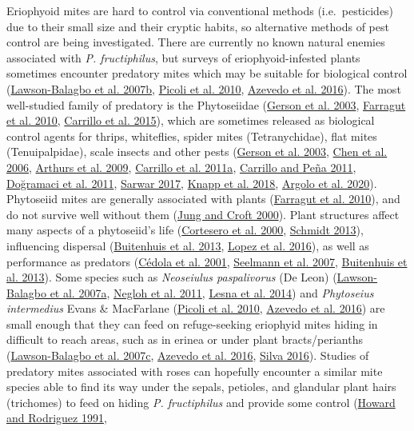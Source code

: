 \documentclass{ufdissertation}[overrideChapters] %
\begin{document}
{Eriophyoid mites are hard to control via conventional methods (i.e.~pesticides) due to their small size and their cryptic habits, so alternative methods of pest control are being investigated. There are currently no known natural enemies associated with \emph{P. fructiphilus}, but surveys of eriophyoid-infested plants sometimes encounter predatory mites which may be suitable for biological control (\protect\hyperlink{ref-LawsonBalagbo2007b}{Lawson-Balagbo et al. 2007b}, \protect\hyperlink{ref-Picoli2010}{Picoli et al. 2010}, \protect\hyperlink{ref-Azevedo2016}{Azevedo et al. 2016}). The most well-studied family of predatory is the Phytoseiidae (\protect\hyperlink{ref-Gerson2003}{Gerson et al. 2003}, \protect\hyperlink{ref-Farragut2010}{Farragut et al. 2010}, \protect\hyperlink{ref-Carrillo2015}{Carrillo et al. 2015}), which are sometimes released as biological control agents for thrips, whiteflies, spider mites (Tetranychidae), flat mites (Tenuipalpidae), scale insects and other pests (\protect\hyperlink{ref-Gerson2003}{Gerson et al. 2003}, \protect\hyperlink{ref-Chen2006}{Chen et al. 2006}, \protect\hyperlink{ref-Arthurs2009}{Arthurs et al. 2009}, \protect\hyperlink{ref-Carrillo2011a}{Carrillo et al. 2011a}, \protect\hyperlink{ref-Carrillo2011}{Carrillo and Peña 2011}, \protect\hyperlink{ref-Dogramaci2011}{Doğramaci et al. 2011}, \protect\hyperlink{ref-Sarwar2017}{Sarwar 2017}, \protect\hyperlink{ref-Knapp2018}{Knapp et al. 2018}, \protect\hyperlink{ref-Argolo2020}{Argolo et al. 2020}). Phytoseiid mites are generally associated with plants (\protect\hyperlink{ref-Farragut2010}{Farragut et al. 2010}), and do not survive well without them (\protect\hyperlink{ref-Jung2000}{Jung and Croft 2000}). Plant structures affect many aspects of a phytoseiid's life (\protect\hyperlink{ref-Cortesero2000}{Cortesero et al. 2000}, \protect\hyperlink{ref-Schmidt2013}{Schmidt 2013}), influencing dispersal (\protect\hyperlink{ref-Buitenhuis2013}{Buitenhuis et al. 2013}, \protect\hyperlink{ref-Lopez2016}{Lopez et al. 2016}), as well as performance as predators (\protect\hyperlink{ref-Cedola2001}{Cédola et al. 2001}, \protect\hyperlink{ref-Seelmann2007}{Seelmann et al. 2007}, \protect\hyperlink{ref-Buitenhuis2013}{Buitenhuis et al. 2013}). Some species such as \emph{Neoseiulus paspalivorus} (De Leon) (\protect\hyperlink{ref-LawsonBalagbo2007}{Lawson-Balagbo et al. 2007a}, \protect\hyperlink{ref-Negloh2011}{Negloh et al. 2011}, \protect\hyperlink{ref-Lesna2014}{Lesna et al. 2014}) and \emph{Phytoseius intermedius} Evans \& MacFarlane (\protect\hyperlink{ref-Picoli2010}{Picoli et al. 2010}, \protect\hyperlink{ref-Azevedo2016}{Azevedo et al. 2016}) are small enough that they can feed on refuge-seeking eriophyid mites hiding in difficult to reach areas, such as in erinea or under plant bracts/perianths (\protect\hyperlink{ref-LawsonBalagbo2007a}{Lawson-Balagbo et al. 2007c}, \protect\hyperlink{ref-Azevedo2016}{Azevedo et al. 2016}, \protect\hyperlink{ref-Silva2016}{Silva 2016}). Studies of predatory mites associated with roses can hopefully encounter a similar mite species able to find its way under the sepals, petioles, and glandular plant hairs (trichomes) to feed on hiding \emph{P. fructiphilus} and provide some control (\protect\hyperlink{ref-Howard1991}{Howard and Rodriguez 1991}, }
\end{document}
